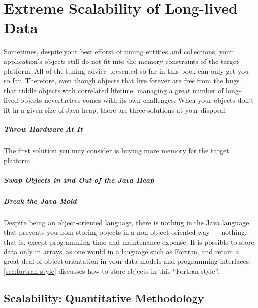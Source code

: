 
\chapter{Extreme Scalability of Long-lived Data}
\label{chapter:large-long-lived}

Sometimes, despite your best efforst of tuning entities and collections, your
application's objects still do not fit into the memory constraints of the target
platform. All of the tuning advice presented so far in this book can only get you
so far. Therefore, even though objects that live forever are free from the bugs
that riddle objects with correlated lifetime, managing a great number of
long-lived objects nevertheless comes with its own challenges. When your objects
don't fit in a given size of Java heap, there are three solutions at your
disposal. 

\paragraph{Throw Hardware At It} The first solution you may consider is buying
more memory for the target platform.

\paragraph{Swap Objects in and Out of the Java Heap}

\paragraph{Break the Java Mold} Despite being an object-oriented language, there
is nothing in the Java language that prevents you from storing objects in a
non-object oriented way --- nothing, that is, except programming time and
maintenance expense. It is possible to store data only in arrays, as one would in
a language such as Fortran, and retain a great deal of object orientation in your
data models and programming interfaces. \autoref{sec:fortran-style} discusses how
to store objects in this ``Fortran style''.

\section{Scalability: Quantitative Methodology}

